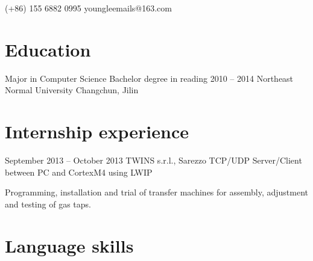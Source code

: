 \documentclass{tccv}
\begin{document}
{(+86) 155 6882 0995}
{youngleemails@163.com}


\section{Education}

\begin{yearlist}

\item[Major in Computer Science \newline
  Bachelor degree in reading]
  {2010 -- 2014}
  {Northeast Normal University}
  {Changchun, Jilin}

\end{yearlist}

\section{Internship experience}

\begin{eventlist}
  
\item{September 2013 -- October 2013}
  {TWINS s.r.l., Sarezzo}
  {TCP/UDP Server/Client between PC and CortexM4 using LWIP}

  Programming, installation and trial of transfer machines for assembly,
  adjustment and testing of gas taps. 
  
\end{eventlist}




\section{Language skills}
\end{document}
